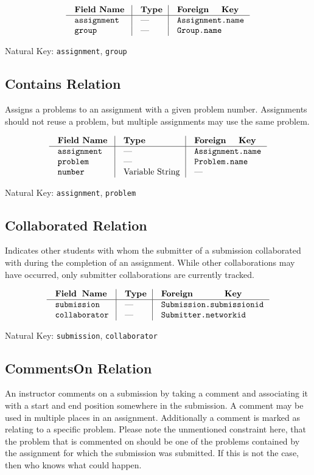 $$\vbox{
  \offinterlineskip
  \halign{
    \strut \quad {\tt #}  & \vrule\quad #  & \vrule\quad # \cr
    {\bf Field Name}  & {\bf Type}  & {\bf Foreign Key}\cr
    \noalign{\hrule}    
    assignment  & ---  & {\tt Assignment.name} \cr
    group  & ---  & {\tt Group.name} \cr
  }
}$$

{\noindent
Natural Key: {\tt assignment}, {\tt group}\par}

\subsection{Contains Relation}
Assigns a problems to an assignment with a given problem number.
Assignments should not reuse a problem,
but multiple assignments may use the same problem.

$$\vbox{
  \offinterlineskip
  \halign{
    \strut \quad {\tt #}  & \vrule\quad #  & \vrule\quad # \cr
    {\bf Field Name}  & {\bf Type}  & {\bf Foreign Key}\cr
    \noalign{\hrule}    
    assignment  & ---  & {\tt Assignment.name} \cr
    problem  & ---  & {\tt Problem.name} \cr
    number  & Variable String  & --- \cr
  }
}$$

{\noindent
Natural Key: {\tt assignment}, {\tt problem}\par}

\subsection{Collaborated Relation}
Indicates other students with whom the submitter of a submission
collaborated with during the completion of an assignment.
While other collaborations may have occurred, only submitter 
collaborations are currently tracked.

$$\vbox{
  \offinterlineskip
  \halign{
    \strut \quad {\tt #}  & \vrule\quad #  & \vrule\quad # \cr
    {\bf Field Name}  & {\bf Type}  & {\bf Foreign Key}\cr
    \noalign{\hrule}   
    submission & --- & {\tt Submission.submissionid} \cr 
    collaborator  & ---  & {\tt Submitter.networkid} \cr
  }
}$$

{\noindent
Natural Key: {\tt submission}, {\tt collaborator}\par}

\subsection{CommentsOn Relation}
An instructor comments on a submission by taking a comment 
and associating it with a start and end position somewhere in the submission. 
A comment may be used in multiple places in an assignment. 
Additionally a comment is marked as relating to a specific problem.
Please note the unmentioned constraint here, that the problem that is commented 
on should be one of the problems contained by the assignment for which the 
submission was submitted. If this is not the case, then who knows what could 
happen.

